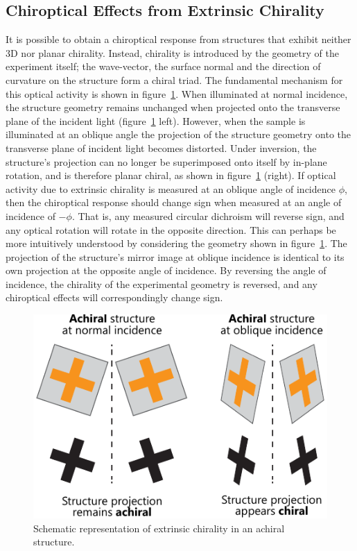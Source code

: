 \subsection{Chiroptical Effects from Extrinsic Chirality}\label{sec:background:Chirality:extrinsic}
It is possible to obtain a chiroptical response from structures that exhibit neither 3D nor planar chirality. Instead, chirality is introduced by the geometry of the experiment itself; the wave-vector, the surface normal and the direction of curvature on the structure form a chiral triad. 
The fundamental mechanism for this optical activity is shown in figure~\ref{fig:background:Chirality:extrinsic}. When illuminated at normal incidence, the structure geometry remains unchanged when projected onto the transverse plane of the incident light (figure~\ref{fig:background:Chirality:extrinsic} left). However, when the sample is illuminated at an oblique angle the projection of the structure geometry onto the transverse plane of incident light becomes distorted. Under inversion, the structure's projection can no longer be superimposed onto itself by in-plane rotation, and is therefore planar chiral, as shown in figure~\ref{fig:background:Chirality:extrinsic} (right). 
If optical activity due to extrinsic chirality is measured at an oblique angle of incidence $\phi$, then the chiroptical response should change sign when measured at an angle of incidence of $-\phi$. That is, any measured circular dichroism will reverse sign, and any optical rotation will rotate in the opposite direction. This can perhaps be more intuitively understood by considering the geometry shown in figure~\ref{fig:background:Chirality:extrinsic}. The projection of the structure's mirror image at oblique incidence is identical to its own projection at the opposite angle of incidence. By reversing the angle of incidence, the chirality of the experimental geometry is reversed, and any chiroptical effects will correspondingly change sign.
\begin{figure}[htb!]
    \centering
    \includegraphics[scale=1.0]{./figures/background/chiroptics/extrinsic_chirality.pdf}
    \caption{\label{fig:background:Chirality:extrinsic}Schematic representation of extrinsic chirality in an achiral structure.}
\end{figure}
